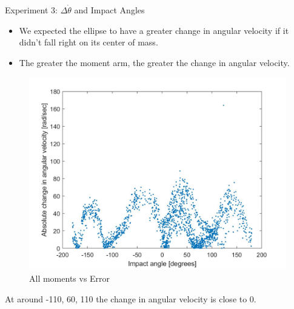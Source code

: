 \begin{frame}{Experiment 3: $\Delta \dot \theta$ and Impact Angles}

\begin{itemize}
    \item We expected the ellipse to have a greater change in angular velocity if it didn't fall right on its center of mass.
    \item The greater the moment arm, the greater the change in angular velocity.
\end{itemize}
\begin{figure}
    \centering
    \includegraphics[scale=0.12]{figures/impact angle vs change in angular velocity.jpg}
    \caption{All moments vs Error}
    \label{fig:MomentsError}
\end{figure}
\item At around -110, 60, 110 the change in angular velocity is close to 0.
\end{frame}

